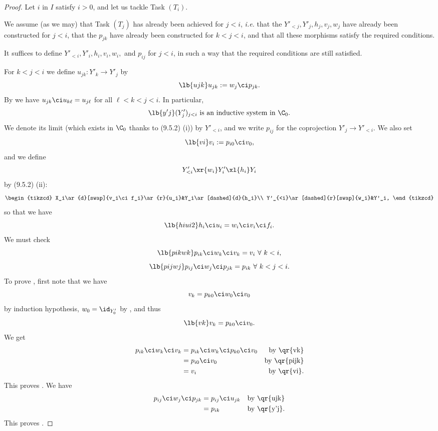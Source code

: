 \documentclass[12pt]{article}
\theoremstyle{remark}
\theoremstyle{definition}
\begin{document}
\begin{proof}
Let $i$ in $I$ satisfy $i>0$, and let us tackle Task $(T_i)$. 

We assume (as we may) that Task $(T_j)$ has already been achieved for $j<i$, {\em i.e.} that the $Y'_{<j},Y'_j,h_j,v_j,w_j$ have already been constructed for $j<i$, that the $p_{jk}$ have already been constructed for $k<j<i$, and that all these morphisms satisfy the required conditions. 

It suffices to define $Y'_{<i},Y'_i,h_i,v_i,w_i,$ and $p_{ij}$ for $j<i$, in such a way that the required conditions are still satisfied. 

For $k<j<i$ we define $u_{jk}:Y'_k\to Y'_j$ by 
\begin{equation}\lb{ujk}
u_{jk}:=w_j\ci p_{jk}.
\end{equation} 
By  we have $u_{jk}\ci u_{k\ell}=u_{j\ell}$ for all $\ell<k<j<i$. In particular, 
\begin{equation}\lb{y'j}
(Y'_j)_{j<i}\text{ is an inductive system in }\C_0.
\end{equation} 
We denote its limit (which exists in $\C_0$ thanks to (9.5.2) (i)) by $Y'_{<i}$, and we write $p_{ij}$ for the coprojection $Y'_j\to Y'_{<i}$. We also set 
\begin{equation}\lb{vi}
v_i:=p_{i0}\ci v_0,
\end{equation} 
and we define
$$
Y'_{<i}\xr{w_i}Y'_i\xl{h_i}Y_i
$$
by (9.5.2) (ii):
$$
\begin{tikzcd}
X_i\ar{d}[swap]{v_i\ci f_i}\ar{r}{u_i}&Y_i\ar[dashed]{d}{h_i}\\
Y'_{<i}\ar[dashed]{r}[swap]{w_i}&Y'_i,
\end{tikzcd}
$$
so that we have  
\begin{equation}\lb{hiui2}
h_i\ci u_i=w_i\ci v_i\ci f_i. 
\end{equation} 
We must check 
\begin{equation}\lb{pikwk}
p_{ik}\ci w_k\ci v_k=v_i\ \forall\ k<i,
\end{equation} 
\begin{equation}\lb{pijwj}
p_{ij}\ci w_j\ci p_{jk}=p_{ik}\ \forall\ k<j<i.
\end{equation}  
To prove , first note that we have 
$$v_k=p_{k0}\ci w_0\ci v_0
$$ 
by induction hypothesis, $w_0=\id_{Y'_0}$ by , and thus 
\begin{equation}\lb{vk}
v_k=p_{k0}\ci v_0.
\end{equation} 
We get 
\begin{align*}
p_{ik}\ci w_k\ci v_k&=p_{ik}\ci w_k\ci p_{k0}\ci v_0&\text{by \qr{vk}}\\ 
&=p_{i0}\ci v_0&\text{by \qr{pijk}}\\ 
&=v_i&\text{by \qr{vi}}.
\end{align*} 
This proves . We have 
\begin{align*}
p_{ij}\ci w_j\ci p_{jk}&=p_{ij}\ci u_{jk}&\text{by \qr{ujk}}\\ 
&=p_{ik}&\text{by \qr{y'j}}.
\end{align*} 
This proves . 


\end{proof}
\end{document}
